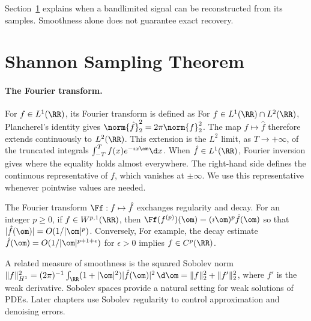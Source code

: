 Section~\ref{subsec-sampling} explains when a bandlimited signal can be reconstructed from its samples. Smoothness alone does not guarantee exact recovery.


\section{Shannon Sampling Theorem}
\label{subsec-sampling}

\paragraph{The Fourier transform.}

For $f \in L^1(\RR)$, its Fourier transform is defined as
For $f\in L^1(\RR)\cap L^2(\RR)$, Plancherel's identity gives $\norm{\hat f}_2^2 = 2\pi\norm{f}_2^2$. The map $f \mapsto \hat f$ therefore extends continuously to $L^2(\RR)$. This extension is the $L^2$ limit, as $T \rightarrow +\infty$, of the truncated integrals $\int_{-T}^T f(x) e^{-\imath x \om} \d x$.
%
When $\hat f \in L^1(\RR)$, Fourier inversion gives
where the equality holds almost everywhere. The right-hand side defines the continuous representative of $f$, which vanishes at $\pm\infty$. We use this representative whenever pointwise values are needed.

The Fourier transform $\Ff : f \mapsto \hat f$ exchanges regularity and decay. For an integer $p\geq0$, if $f\in W^{p,1}(\RR)$, then $\Ff(f^{(p)})(\om) = (\imath \om)^{p} \hat f(\om)$ so that $|\hat f(\om)|=O(1/|\om|^p)$.
%
Conversely, 
For example, the decay estimate $\hat f(\om)=O(1/|\om|^{p+1+\epsilon})$ for $\epsilon>0$ implies $f \in C^p(\RR)$.

A related measure of smoothness is the squared Sobolev norm $\|f\|_{H^1}^2=(2\pi)^{-1}\int_\RR (1+|\om|^2)|\hat f(\om)|^2\,\d\om=\|f\|_2^2+\|f'\|_2^2$, where $f'$ is the weak derivative. Sobolev spaces provide a natural setting for weak solutions of PDEs. Later chapters use Sobolev regularity to control approximation and denoising errors.

